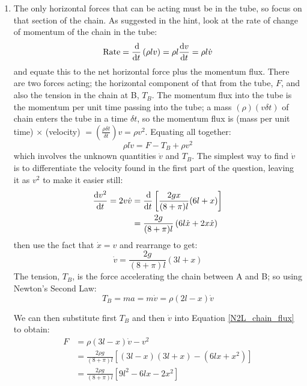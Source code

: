 \begin{problem}
{\begin{enumerate}
	\item The only horizontal forces that can be acting must be in the tube, so focus on that section of the chain. As suggested in the hint, look at the rate of change of momentum of the chain in the tube:
\begin{equation*} \textrm{Rate} = \frac{\operatorname{d}\!}{\operatorname{d}\! t}\left(\rho l v\right) = \rho l \frac{\operatorname{d}\! v}{\operatorname{d}\! t} = \rho l \dot{v} \end{equation*}
and equate this to the net horizontal force plus the momentum flux. There are two forces acting; the horizontal component of that from the tube, $F$, and also the tension in the chain at B, $T_{B}$. The momentum flux into the tube is the momentum per unit time passing into the tube; a mass $(\rho)(v\delta t)$ of chain enters the tube in a time $\delta t$, so the momentum flux is (mass per unit time) $\times$ (velocity) $= \left(\frac{\rho \delta t}{\delta t}\right) v = \rho v^{2}$.
Equating all together:
\begin{equation} \rho l \dot{v} = F - T_{B} + \rho v^{2} \label{N2L_chain_flux}\end{equation}
which involves the unknown quantities $\dot{v}$ and $T_{B}$. The simplest way to find $\dot{v}$ is to differentiate the velocity found in the first part of the question, leaving it as $v^{2}$ to make it easier still:
\begin{align*} \frac{\operatorname{d}\! v^{2}}{\operatorname{d}\! t} = 2v\dot{v} &= \frac{\operatorname{d}\!}{\operatorname{d}\! t} \left[\frac{2gx}{(8 + \pi)l}(6l + x)\right] \\ &= \frac{2g}{(8 + \pi)l}\left(6l\dot{x} + 2x\dot{x}\right) \end{align*}
then use the fact that $\dot{x} = v$ and rearrange to get:
\begin{equation*} \dot{v} = \frac{2g}{(8 + \pi)l}\left(3l + x\right) \end{equation*}
The tension, $T_{B}$, is the force accelerating the chain between A and B; so using Newton's Second Law:
\begin{equation*} T_{B} = ma = m\dot{v} = \rho(2l - x)\dot{v} \end{equation*}

We can then substitute first $T_{B}$ and then $\dot{v}$ into Equation \eqref{N2L_chain_flux} to obtain:
\begin{align*} F &= \rho(3l - x)\dot{v} - v^{2} \\ &= \frac{2\rho g}{(8 + \pi)l}\left[(3l - x)(3l + x) - (6lx + x^{2})\right] \\ &= \frac{2\rho g}{(8 + \pi)l}\left[9l^{2} - 6lx - 2x^{2}\right] \end{align*}
\end{enumerate}
}
\end{problem}